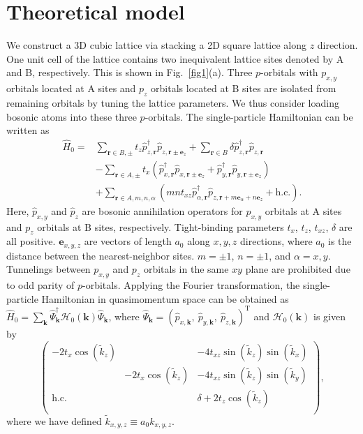 \documentclass[aps,pra,floatfix,twocolumn,superscriptaddress]{revtex4-1}
\begin{document}
\section{Theoretical model}
\label{Theoretical}
We construct a 3D cubic lattice via stacking a 2D square lattice along $z$ direction. One unit cell of the lattice contains two inequivalent lattice sites denoted by A and B, respectively. This is shown in Fig.~\ref{fig1}(a). Three $p$-orbitals with $p_{x,y}$ orbitals located at A sites and $p_z$ orbitals located at B sites are isolated from remaining orbitals by tuning the lattice parameters. We thus consider loading bosonic atoms into these three $p$-orbitals. The single-particle Hamiltonian can be written as
\begin{equation}
	\begin{aligned}
		\hat{H}_0=&\sum_{\mathbf{r}\in B,\pm}t_z\hat{p}^\dagger_{z,\mathbf{r}}\hat{p}_{z,\mathbf{r}\pm\mathbf{e}_z}+\sum_{\mathbf{r}\in B}\delta\hat{p}^\dagger_{z,\mathbf{r}}\hat{p}_{z,\mathbf{r}}\\
		&-\sum_{\mathbf{r}\in A,\pm}t_x\left(\hat{p}^\dagger_{x,\mathbf{r}}\hat{p}_{x,\mathbf{r}\pm\mathbf{e}_z}+\hat{p}^\dagger_{y,\mathbf{r}}\hat{p}_{y,\mathbf{r}\pm\mathbf{e}_z}\right)\\
		&+\sum_{\mathbf{r}\in A,m,n,\alpha}\left(mn t_{xz}\hat{p}^\dagger_{\alpha,\mathbf{r}}\hat{p}_{z,\mathbf{r}+m\mathbf{e}_\alpha+n\mathbf{e}_z}+\text{h.c.}\right).
		\label{tbm}
	\end{aligned}
\end{equation}
Here, $\hat{p}_{x,y}$ and $\hat{p}_z$ are bosonic annihilation operators for $p_{x,y}$ orbitals at A sites and $p_z$ orbitals at B sites, respectively. Tight-binding parameters $t_x$, $t_z$, $t_{xz}$, $\delta$ are all positive. $\mathbf{e}_{x,y,z}$ are vectors of length $a_0$ along $x,y,z$ directions, where $a_0$ is the distance between the nearest-neighbor sites. $m=\pm 1$, $n=\pm 1$, and $\alpha=x,y$. Tunnelings between $p_{x,y}$ and $p_z$ orbitals in the same $xy$ plane are prohibited due to odd parity of $p$-orbitals. Applying the Fourier transformation, the single-particle Hamiltonian in quasimomentum space can be obtained as $\hat{H}_0=\sum_\mathbf{k}\hat{\Psi}_\mathbf{k}^\dag \mathcal{H}_0( \mathbf{k})\hat{\Psi}_\mathbf{k}$, where $\hat{\Psi}_\mathbf{k}=(\hat{p}_{x,\mathbf{k}},\ \hat{p}_{y,\mathbf{k}},\ \hat{p}_{z,\mathbf{k}})^\mathrm{T}$ and $\mathcal{H}_0( \mathbf{k})$ is given by
\begin{equation}
\left( \begin{matrix}
-2t_x\cos(\tilde{k}_z)&		&    -4t_{xz}\sin(\tilde{k}_z)\sin(\tilde{k}_x)\\
&		-2t_x\cos(\tilde{k}_z)&    -4t_{xz}\sin(\tilde{k}_z)\sin(\tilde{k}_y)\\
\text{h.c.}&		&      \delta+2t_z\cos(\tilde{k}_z)\\
\end{matrix} \right),
\label{tbMatrix}
\end{equation}
where we have defined $\tilde{k}_{x,y,z}\equiv a_0k_{x,y,z}$.
\end{document}
